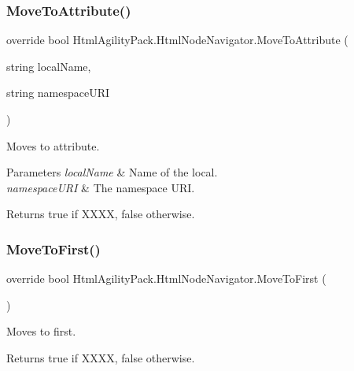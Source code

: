 \subsubsection{\texorpdfstring{Move\+To\+Attribute()}{MoveToAttribute()}}
{\footnotesize\ttfamily override bool Html\+Agility\+Pack.\+Html\+Node\+Navigator.\+Move\+To\+Attribute (\begin{DoxyParamCaption}\item[{string}]{local\+Name,  }\item[{string}]{namespace\+U\+RI }\end{DoxyParamCaption})\hspace{0.3cm}{\ttfamily [inline]}}



Moves to attribute. 


\begin{DoxyParams}{Parameters}
{\em local\+Name} & Name of the local.\\
\hline
{\em namespace\+U\+RI} & The namespace U\+RI.\\
\hline
\end{DoxyParams}
\begin{DoxyReturn}{Returns}
{\ttfamily true} if X\+X\+XX, {\ttfamily false} otherwise.
\end{DoxyReturn}
\mbox{\label{class_html_agility_pack_1_1_html_node_navigator_a526c05386cfddeaa487a0faec47b7249}} 
\subsubsection{\texorpdfstring{Move\+To\+First()}{MoveToFirst()}}
{\footnotesize\ttfamily override bool Html\+Agility\+Pack.\+Html\+Node\+Navigator.\+Move\+To\+First (\begin{DoxyParamCaption}{ }\end{DoxyParamCaption})\hspace{0.3cm}{\ttfamily [inline]}}



Moves to first. 

\begin{DoxyReturn}{Returns}
{\ttfamily true} if X\+X\+XX, {\ttfamily false} otherwise.
\end{DoxyReturn}
\mbox{\label{class_html_agility_pack_1_1_html_node_navigator_a6ccb3234a1eb952d67f616228d27dd12}} 
